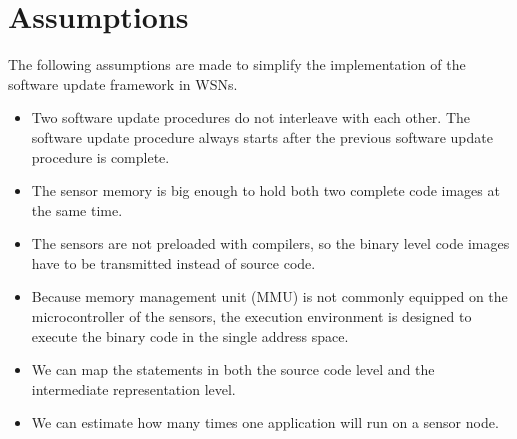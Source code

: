 \section{Assumptions}
The following assumptions are made to simplify the implementation of the software update framework in WSNs.
\begin{itemize}
\item Two software update procedures do not interleave with each other. The software update procedure always starts after the previous software update procedure is complete.
\item The sensor memory is big enough to hold both two complete code images at the same time.
\item The sensors are not preloaded with compilers, so the binary level code images have to be transmitted instead of source code.
\item Because memory management unit (MMU) is not commonly equipped on the microcontroller of the sensors, the execution environment is designed to execute the binary code in the single address space. 
\item We can map the statements in both the source code level and the intermediate representation level.
\item We can estimate how many times one application will run on a sensor node.

\end{itemize}

